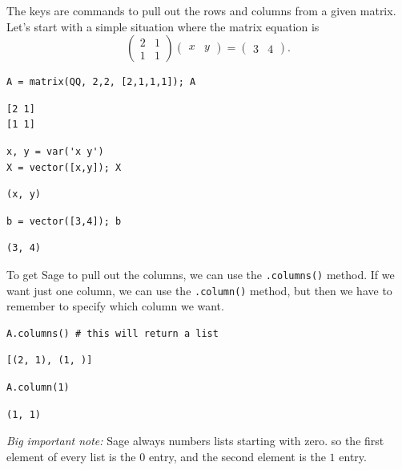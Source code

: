 \documentclass[10pt,]{book}
\theoremstyle{plain}
\theoremstyle{definition}
\numberwithin{equation}{section}
\begin{document}
      The keys are commands to pull out the rows and columns from a given matrix.
      Let's start with a simple situation where the matrix equation is
      \[
        \begin{pmatrix} 2 & 1 \\ 1 & 1 \end{pmatrix}
        \begin{pmatrix} x & y \end{pmatrix} =
        \begin{pmatrix} 3 & 4 \end{pmatrix}.
      \]
\begin{lstlisting}[style=sageinput]
A = matrix(QQ, 2,2, [2,1,1,1]); A
\end{lstlisting}
\begin{lstlisting}[style=sageoutput]
[2 1]
[1 1]
\end{lstlisting}
\begin{lstlisting}[style=sageinput]
x, y = var('x y')
X = vector([x,y]); X
\end{lstlisting}
\begin{lstlisting}[style=sageoutput]
(x, y)
\end{lstlisting}
\begin{lstlisting}[style=sageinput]
b = vector([3,4]); b
\end{lstlisting}
\begin{lstlisting}[style=sageoutput]
(3, 4)
\end{lstlisting}
\par

      To get Sage to pull out the columns, we can use the \verb?.columns()?
      method. If we want just one column, we can use the \verb?.column()? method,
      but then we have to remember to specify which column we want.
\begin{lstlisting}[style=sageinput]
A.columns() # this will return a list
\end{lstlisting}
\begin{lstlisting}[style=sageoutput]
[(2, 1), (1, )]
\end{lstlisting}
\begin{lstlisting}[style=sageinput]
A.column(1)
\end{lstlisting}
\begin{lstlisting}[style=sageoutput]
(1, 1)
\end{lstlisting}
\par

      \emph{Big important note:} Sage always numbers lists starting with zero.
      so the first element of every list is the \(0\) entry, and the second
      element is the \(1\) entry.
\par
\end{document}
